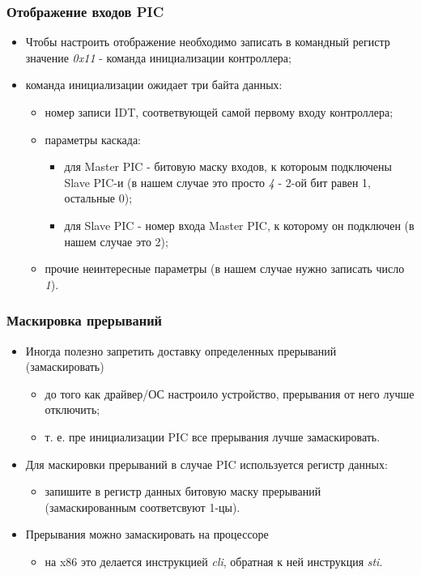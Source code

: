 \begin{frame}
\frametitle{Отображение входов PIC}
\begin{itemize}
  \item Чтобы настроить отображение необходимо записать в командный регистр
  значение \emph{0x11} - команда инициализации контроллера;
  \item команда инициализации ожидает три байта данных:
  \begin{itemize}
    \item номер записи IDT, соответвующей самой первому входу контроллера;
    \item параметры каскада:
    \begin{itemize}
      \item для Master PIC - битовую маску входов, к котороым подключены Slave
      PIC-и (в нашем случае это просто \emph{4} - 2-ой бит равен 1, остальные
      0);
      \item для Slave PIC - номер входа Master PIC, к которому он подключен (в
      нашем случае это 2);
    \end{itemize}
    \item прочие неинтересные параметры (в нашем случае нужно записать число
    \emph{1}).
  \end{itemize}
\end{itemize}
\end{frame}

\begin{frame}
\frametitle{Маскировка прерываний}
\begin{itemize}
  \item Иногда полезно запретить доставку определенных прерываний
  (замаскировать)
  \begin{itemize}
    \item до того как драйвер/ОС настроило устройство, прерывания от него лучше
    отключить;
    \item т. е. пре инициализации PIC все прерывания лучше замаскировать.
  \end{itemize}
  \item Для маскировки прерываний в случае PIC используется регистр данных:
  \begin{itemize}
    \item запишите в регистр данных битовую маску прерываний (замаскированным
    соответсвуют 1-цы).
  \end{itemize}
  \item Прерывания можно замаскировать на процессоре
  \begin{itemize}
    \item на x86 это делается инструкцией \emph{cli}, обратная к ней инструкция \emph{sti}.
  \end{itemize}
\end{itemize}
\end{frame}

